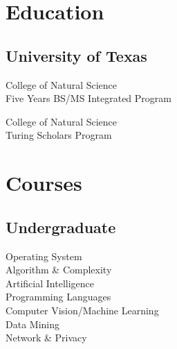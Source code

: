 \documentclass[]{deedy-resume-openfont}
\begin{document}
%
%

%
%



%
%

\begin{minipage}[t]{0.33\textwidth} 


\section{Education} 

\subsection{University of Texas}

\vspace{\topsep} %

College of Natural Science \\
Five Years BS/MS Integrated Program \\
\sectionsep

College of Natural Science \\
Turing Scholars Program \\
\sectionsep



\section{Courses}

\subsection{Undergraduate}
Operating System \\
Algorithm \& Complexity \\
Artificial Intelligence \\
Programming Languages \\
Computer Vision/Machine Learning \\
Data Mining \\
Network \& Privacy \\


\end{minipage}
\end{document}
